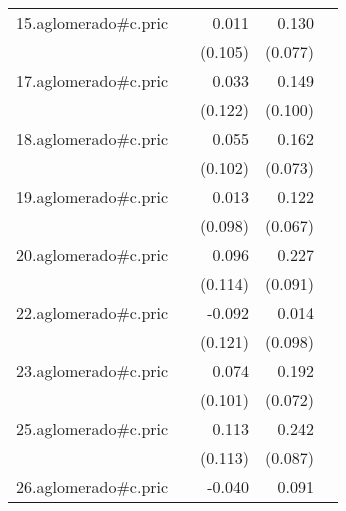 {\begin{longtable}{l*{4}{D{.}{.}{-1}}}
\addlinespace
15.aglomerado#c.pric&                     &       0.011         &       0.130         &                     \\
            &                     &     (0.105)         &     (0.077)         &                     \\
\addlinespace
17.aglomerado#c.pric&                     &       0.033         &       0.149         &                     \\
            &                     &     (0.122)         &     (0.100)         &                     \\
\addlinespace
18.aglomerado#c.pric&                     &       0.055         &       0.162\sym{*}  &                     \\
            &                     &     (0.102)         &     (0.073)         &                     \\
\addlinespace
19.aglomerado#c.pric&                     &       0.013         &       0.122         &                     \\
            &                     &     (0.098)         &     (0.067)         &                     \\
\addlinespace
20.aglomerado#c.pric&                     &       0.096         &       0.227\sym{*}  &                     \\
            &                     &     (0.114)         &     (0.091)         &                     \\
\addlinespace
22.aglomerado#c.pric&                     &      -0.092         &       0.014         &                     \\
            &                     &     (0.121)         &     (0.098)         &                     \\
\addlinespace
23.aglomerado#c.pric&                     &       0.074         &       0.192\sym{**} &                     \\
            &                     &     (0.101)         &     (0.072)         &                     \\
\addlinespace
25.aglomerado#c.pric&                     &       0.113         &       0.242\sym{**} &                     \\
            &                     &     (0.113)         &     (0.087)         &                     \\
\addlinespace
26.aglomerado#c.pric&                     &      -0.040         &       0.091         &                     \\

\end{longtable}}

